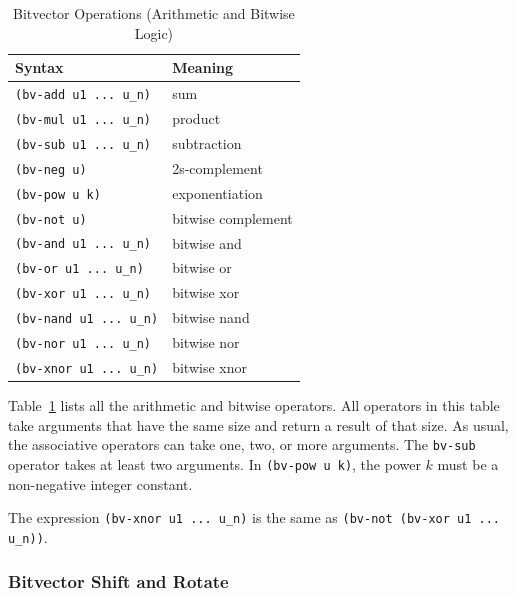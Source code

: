 \documentclass[11pt,twoside,fleqn,openright,titlepage]{cslreport}
\begin{document}
\begin{table}
\begin{small}
\begin{center}
\begin{tabular}{|p{5cm}|l|}
\hline Syntax & Meaning \\ 
\hline
\texttt{(bv-add u1 ... u\_n)} & sum \\
\texttt{(bv-mul u1 ... u\_n)} & product \\
\texttt{(bv-sub u1 ... u\_n)} & subtraction \\
\texttt{(bv-neg u)} & 2s-complement \\
\texttt{(bv-pow u k)} & exponentiation \\
\hline
\texttt{(bv-not u)} & bitwise complement \\
\texttt{(bv-and u1 ... u\_n)} & bitwise and \\
\texttt{(bv-or u1 ... u\_n)} & bitwise or \\
\texttt{(bv-xor u1 ... u\_n)} & bitwise xor \\
\texttt{(bv-nand u1 ... u\_n)} & bitwise nand \\
\texttt{(bv-nor u1 ... u\_n)} & bitwise nor \\
\texttt{(bv-xnor u1 ... u\_n)} & bitwise xnor \\
\hline
\end{tabular}
\end{center}
\end{small}
\caption{Bitvector Operations (Arithmetic and Bitwise Logic)}
\label{bitvectors1}
\end{table}

Table~\ref{bitvectors1} lists all the arithmetic and bitwise
operators. All operators in this table take arguments that have the
same size and return a result of that size.  As usual, the associative
operators can take one, two, or more arguments. The \texttt{bv-sub}
operator takes at least two arguments. In \texttt{(bv-pow u k)},
the power $k$ must be a non-negative integer constant.

\medskip\noindent
The expression \texttt{(bv-xnor u1 ... u\_n)} is the same as
\texttt{(bv-not (bv-xor u1 ... u\_n))}.

\subsubsection*{Bitvector Shift and Rotate}
\end{document}
